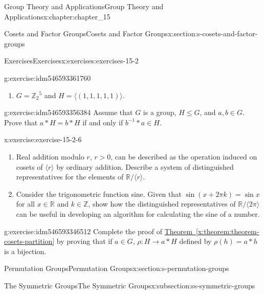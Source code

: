\documentclass[oneside,10pt,]{book}
\newcommand{\xreffont}{\relax}
\numberwithin{equation}{section}
\begin{document}
\begin{chapterptx}{Group Theory and Applications}{}{Group Theory and Applications}{}{}{x:chapter:chapter_15}
\begin{sectionptx}{Cosets and Factor Groups}{}{Cosets and Factor Groups}{}{}{x:section:s-cosets-and-factor-groups}
\begin{exercises-subsection}{Exercises}{}{Exercises}{}{}{x:exercises:exercises-15-2}
\begin{divisionexercise}{4}{}{}{g:exercise:idm546593361760}
\begin{enumerate}[label=(\alph*)]
\item{}\(G =\mathbb{Z}_2{}^5\)  and \(H = \langle (1, 1, 1, 1, 1)\rangle\).%
\end{enumerate}
%
\end{divisionexercise}%
\begin{divisionexercise}{5}{}{}{g:exercise:idm546593356384}%
Assume that \(G\) is a group, \(H \leq  G\), and \(a, b \in  G\).  Prove that \(a*H= b*H\)  if and only if  \(b^{-1}*a \in H\).%
\end{divisionexercise}%
\begin{divisionexercise}{6}{}{}{x:exercise:exercise-15-2-6}%
%
\begin{enumerate}[label=(\alph*)]
\item{}Real addition modulo \(r\),  \(r > 0\), can be described as the operation induced on cosets of \(\langle r\rangle\) by ordinary addition. Describe a system of distinguished representatives for the elements of \(\mathbb{R}/\langle r\rangle\).%
\item{}Consider the trigonometric function sine. Given that \(\sin (x+2\pi k) = \sin  x\) for all \(x\in \mathbb{R}\) and \(k\in \mathbb{Z}\), show how the distinguished representatives of \(\mathbb{R}/\langle 2\pi \rangle\) can be useful in developing an algorithm for calculating the sine of a number.%
\end{enumerate}
%
\end{divisionexercise}%
\begin{divisionexercise}{7}{}{}{g:exercise:idm546593346512}%
Complete the proof of \hyperref[x:theorem:theorem-cosets-partition]{Theorem~{\xreffont\ref{x:theorem:theorem-cosets-partition}}} by proving that if \(a \in  G\), \(\rho:H \to  a*H\) defined by \(\rho(h)= a*h\) is a bijection.%
\end{divisionexercise}%
\end{exercises-subsection}
\end{sectionptx}
%
%
\typeout{************************************************}
\typeout{************************************************}
%
\begin{sectionptx}{Permutation Groups}{}{Permutation Groups}{}{}{x:section:s-permutation-groups}
%
%
%
\typeout{************************************************}
\typeout{************************************************}
%
\begin{subsectionptx}{The Symmetric Groups}{}{The Symmetric Groups}{}{}{x:subsection:ss-symmetric-groups}

\end{subsectionptx}
\end{sectionptx}
\end{chapterptx}
\end{document}
